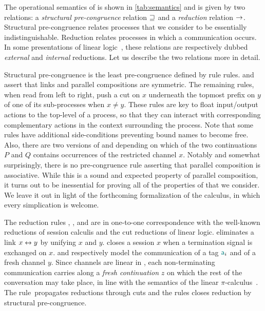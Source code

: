 The operational semantics of \Calculus is shown in \cref{tab:semantics} and is
given by two relations: a \emph{structural pre-congruence} relation $\sqsupseteq$ and
a \emph{reduction} relation $\rightarrow$. Structural pre-congruence relates processes
that we consider to be essentially indistinguishable. Reduction relates
processes in which a communication occurs. In some presentations of linear
logic~\cite{Doumane}, these relations are respectively dubbed \emph{external}
and \emph{internal} reductions. Let us describe the two relations more in
detail.

Structural pre-congruence is the least pre-congruence defined by rule
 rules.
%
\SLink and \SComm assert that links and parallel compositions are symmetric. The
remaining rules, when read from left to right, push a cut on $x$ underneath the
topmost prefix on $y$ of one of its sub-processes when $x \ne y$. These rules
are key to float input/output actions to the top-level of a process, so that
they can interact with corresponding complementary actions in the context
surrounding the process.
%
Note that some rules have additional side-conditions preventing bound names to
become free. Also, there are two
versions of \SForkL and \SForkR depending on which of the two continuations $P$
and $Q$ contains occurrences of the restricted channel $x$.
%
Notably and somewhat surprisingly, there is no pre-congruence rule asserting
that parallel composition is associative. While this is a sound and expected
property of parallel composition, it turns out to be inessential for proving all
of the properties of \Calculus that we consider. We leave it out in light of the
forthcoming formalization of the calculus, in which every simplication is
welcome.

The reduction rules \RLink, \RClose, \RSelect and \RFork are in one-to-one
correspondence with the well-known reductions of session calculis and the cut
reductions of linear logic. \RLink eliminates a link $x\leftrightarrow y$ by unifying $x$
and $y$. \RClose closes a session $x$ when a termination signal is exchanged on
$x$. \RSelect and \RFork respectively model the communication of a tag $\mathsf{\color{teal}a}_i$
and of a fresh channel $y$. Since channels are linear in \Calculus, each
non-terminating communication carries along a \emph{fresh continuation} $z$ on
which the rest of the conversation may take place, in line with the semantics of
the linear $\pi$-calculus~\cite{KobayashiPierceTurner99}.
%
The rule~\RCut propagates reductions through cuts and the rules \RCong closes
reduction by structural pre-congruence.